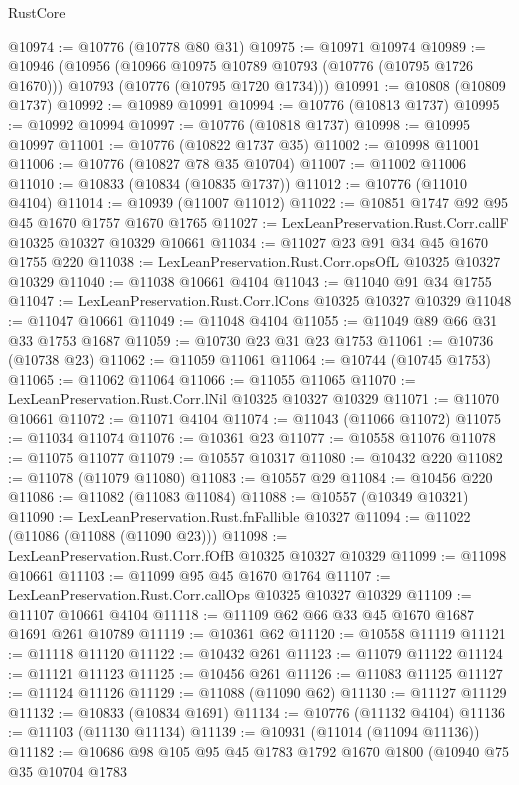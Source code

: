 \begin{lexlean}{RustCore}
\begin{coremodule}
@10974 := @10776 (@10778 @80 @31)
@10975 := @10971 @10974
@10989 := @10946
    (@10956
      (@10966 @10975 @10789 @10793 (@10776 (@10795 @1726 @1670)))
      @10793
      (@10776 (@10795 @1720 @1734)))
@10991 := @10808 (@10809 @1737)
@10992 := @10989 @10991
@10994 := @10776 (@10813 @1737)
@10995 := @10992 @10994
@10997 := @10776 (@10818 @1737)
@10998 := @10995 @10997
@11001 := @10776 (@10822 @1737 @35)
@11002 := @10998 @11001
@11006 := @10776 (@10827 @78 @35 @10704)
@11007 := @11002 @11006
@11010 := @10833 (@10834 (@10835 @1737))
@11012 := @10776 (@11010 @4104)
@11014 := @10939 (@11007 @11012)
@11022 := @10851 @1747 @92 @95 @45 @1670 @1757 @1670 @1765
@11027 := LexLeanPreservation.Rust.Corr.callF @10325 @10327 @10329 @10661
@11034 := @11027 @23 @91 @34 @45 @1670 @1755 @220
@11038 := LexLeanPreservation.Rust.Corr.opsOfL @10325 @10327 @10329
@11040 := @11038 @10661 @4104
@11043 := @11040 @91 @34 @1755
@11047 := LexLeanPreservation.Rust.Corr.lCons @10325 @10327 @10329
@11048 := @11047 @10661
@11049 := @11048 @4104
@11055 := @11049 @89 @66 @31 @33 @1753 @1687
@11059 := @10730 @23 @31 @23 @1753
@11061 := @10736 (@10738 @23)
@11062 := @11059 @11061
@11064 := @10744 (@10745 @1753)
@11065 := @11062 @11064
@11066 := @11055 @11065
@11070 := LexLeanPreservation.Rust.Corr.lNil @10325 @10327 @10329
@11071 := @11070 @10661
@11072 := @11071 @4104
@11074 := @11043 (@11066 @11072)
@11075 := @11034 @11074
@11076 := @10361 @23
@11077 := @10558 @11076
@11078 := @11075 @11077
@11079 := @10557 @10317
@11080 := @10432 @220
@11082 := @11078 (@11079 @11080)
@11083 := @10557 @29
@11084 := @10456 @220
@11086 := @11082 (@11083 @11084)
@11088 := @10557 (@10349 @10321)
@11090 := LexLeanPreservation.Rust.fnFallible @10327
@11094 := @11022 (@11086 (@11088 (@11090 @23)))
@11098 := LexLeanPreservation.Rust.Corr.fOfB @10325 @10327 @10329
@11099 := @11098 @10661
@11103 := @11099 @95 @45 @1670 @1764
@11107 := LexLeanPreservation.Rust.Corr.callOps @10325 @10327 @10329
@11109 := @11107 @10661 @4104
@11118 := @11109 @62 @66 @33 @45 @1670 @1687 @1691 @261 @10789
@11119 := @10361 @62
@11120 := @10558 @11119
@11121 := @11118 @11120
@11122 := @10432 @261
@11123 := @11079 @11122
@11124 := @11121 @11123
@11125 := @10456 @261
@11126 := @11083 @11125
@11127 := @11124 @11126
@11129 := @11088 (@11090 @62)
@11130 := @11127 @11129
@11132 := @10833 (@10834 @1691)
@11134 := @10776 (@11132 @4104)
@11136 := @11103 (@11130 @11134)
@11139 := @10931 (@11014 (@11094 @11136))
@11182 := @10686
    @98
    @105
    @95
    @45
    @1783
    @1792
    @1670
    @1800
    (@10940
      @75
      @35
      @10704
      @1783

\end{coremodule}
\end{lexlean}
